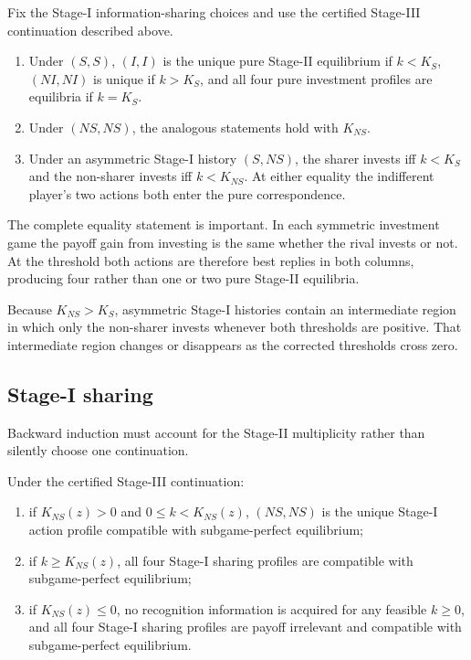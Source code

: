 \begin{proposition}\label{prop:stage2}
Fix the Stage-I information-sharing choices and use the certified Stage-III continuation described above.
\begin{enumerate}
\item Under \((S,S)\), \((I,I)\) is the unique pure Stage-II equilibrium if \(k<K_S\), \((NI,NI)\) is unique if \(k>K_S\), and all four pure investment profiles are equilibria if \(k=K_S\).
\item Under \((NS,NS)\), the analogous statements hold with \(K_{NS}\).
\item Under an asymmetric Stage-I history \((S,NS)\), the sharer invests iff \(k<K_S\) and the non-sharer invests iff \(k<K_{NS}\).  At either equality the indifferent player's two actions both enter the pure correspondence.
\end{enumerate}
\end{proposition}

The complete equality statement is important.  In each symmetric investment game the payoff gain from investing is the same whether the rival invests or not.  At the threshold both actions are therefore best replies in both columns, producing four rather than one or two pure Stage-II equilibria.

Because \(K_{NS}>K_S\), asymmetric Stage-I histories contain an intermediate region in which only the non-sharer invests whenever both thresholds are positive.  That intermediate region changes or disappears as the corrected thresholds cross zero.

\subsection{Stage-I sharing}

Backward induction must account for the Stage-II multiplicity rather than silently choose one continuation.

\begin{proposition}\label{prop:stage1}
Under the certified Stage-III continuation:
\begin{enumerate}
\item if \(K_{NS}(z)>0\) and \(0\le k<K_{NS}(z)\), \((NS,NS)\) is the unique Stage-I action profile compatible with subgame-perfect equilibrium;
\item if \(k\ge K_{NS}(z)\), all four Stage-I sharing profiles are compatible with subgame-perfect equilibrium;
\item if \(K_{NS}(z)\le0\), no recognition information is acquired for any feasible \(k\ge0\), and all four Stage-I sharing profiles are payoff irrelevant and compatible with subgame-perfect equilibrium.
\end{enumerate}
\end{proposition}

